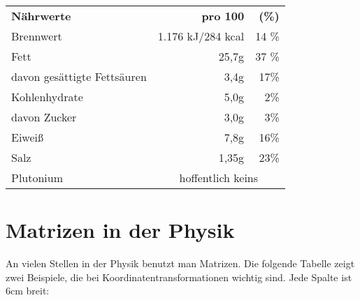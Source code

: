 \documentclass[a4paper, 10pt,onecolumn]{scrartcl}
\begin{document}
\begin{center}
	\begin{tabular}{l|r|r}
		\hline \hline
		\textbf{Nährwerte} & \textbf{pro 100} & \textbf{(\%)}\footnotemark[1]\\
		Brennwert & 1.176 kJ/284 kcal & 14 \%  \\
		Fett & 25,7g & 37 \% \\
		\quad davon gesättigte Fettsäuren & 3,4g & 17\% \\
		Kohlenhydrate & 5,0g & 2\% \\
		\quad davon Zucker & 3,0g & 3\% \\
		Eiweiß & 7,8g & 16\% \\
		Salz & 1,35g & 23\% \\
		Plutonium & \multicolumn{2}{c}{hoffentlich keins}\\
		\hline \hline
		
	\end{tabular}
\end{center}
\section{Matrizen in der Physik}

An vielen Stellen in der Physik benutzt man Matrizen. Die folgende Tabelle zeigt zwei Beispiele, die bei Koordinatentransformationen wichtig sind. Jede Spalte ist 6cm breit:
\end{document}
